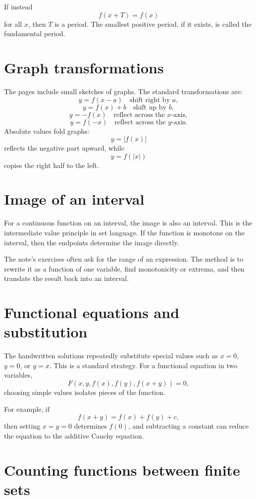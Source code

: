 If instead
\[
  f(x+T)=f(x)
\]
for all $x$, then $T$ is a period.  The smallest positive period, if it exists, is called the fundamental period.

\section{Graph transformations}

The pages include small sketches of graphs.  The standard transformations are:
\[
  y=f(x-a) \quad \text{shift right by }a,
\]
\[
  y=f(x)+b \quad \text{shift up by }b,
\]
\[
  y=-f(x) \quad \text{reflect across the }x\text{-axis},
\]
\[
  y=f(-x) \quad \text{reflect across the }y\text{-axis}.
\]
Absolute values fold graphs:
\[
  y=|f(x)|
\]
reflects the negative part upward, while
\[
  y=f(|x|)
\]
copies the right half to the left.

\section{Image of an interval}

For a continuous function on an interval, the image is also an interval.  This is the intermediate value principle in set language.  If the function is monotone on the interval, then the endpoints determine the image directly.

The note's exercises often ask for the range of an expression.  The method is to rewrite it as a function of one variable, find monotonicity or extrema, and then translate the result back into an interval.

\section{Functional equations and substitution}

The handwritten solutions repeatedly substitute special values such as $x=0$, $y=0$, or $y=x$.  This is a standard strategy.  For a functional equation in two variables,
\[
  F(x,y,f(x),f(y),f(x+y))=0,
\]
choosing simple values isolates pieces of the function.

For example, if
\[
  f(x+y)=f(x)+f(y)+c,
\]
then setting $x=y=0$ determines $f(0)$, and subtracting a constant can reduce the equation to the additive Cauchy equation.

\section{Counting functions between finite sets}

